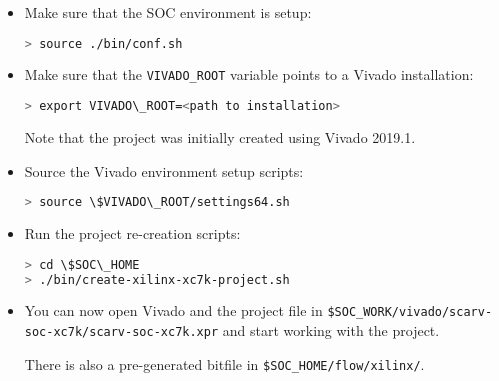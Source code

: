 \begin{itemize}

\item Make sure that the SOC environment is setup:

\begin{lstlisting}[style=block, language=bash]
> source ./bin/conf.sh
\end{lstlisting}

\item Make sure that the {\tt VIVADO\_ROOT} variable points to a Vivado
      installation:

\begin{lstlisting}[style=block, language=bash]
> export VIVADO\_ROOT=<path to installation>
\end{lstlisting}

    Note that the project was initially created using Vivado 2019.1.

\item Source the Vivado environment setup scripts:

\begin{lstlisting}[style=block, language=bash]
> source \$VIVADO\_ROOT/settings64.sh
\end{lstlisting}

\item Run the project re-creation scripts:

\begin{lstlisting}[style=block, language=bash]
> cd \$SOC\_HOME
> ./bin/create-xilinx-xc7k-project.sh
\end{lstlisting}

\item You can now open Vivado and the project file in
  {\tt \$SOC\_WORK/vivado/scarv-soc-xc7k/scarv-soc-xc7k.xpr}
  and start working with the project.

  There is also a pre-generated bitfile in 
  {\tt \$SOC\_HOME/flow/xilinx/}.

\end{itemize}

